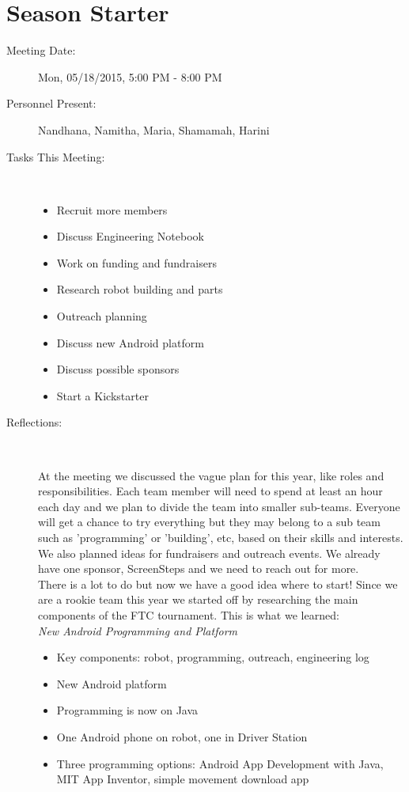 \documentclass[11pt,fleqn]{book} %
\begin{document}
\chapter{Season Starter}
\begin{description}
\item[Meeting Date:] Mon, 05/18/2015, 5:00 PM - 8:00 PM
\item[Personnel Present:] Nandhana, Namitha, Maria, Shamamah, Harini\\

\item[Tasks This Meeting:] \
\begin{itemize}
\item Recruit more members
\item Discuss Engineering Notebook
\item Work on funding and fundraisers
\item Research robot building and parts
\item Outreach planning
\item Discuss new Android platform
\item Discuss possible sponsors
\item Start a Kickstarter\\
\end{itemize}

\item[Reflections:] \

At the meeting we discussed the vague plan for this year, like roles and responsibilities. Each team member will need to spend at least an hour each day and we plan to divide the team into smaller sub-teams. Everyone will get a chance to try everything but they may belong to a sub team such as 'programming' or 'building', etc, based on their skills and interests. We also planned ideas for fundraisers and outreach events. We already have one sponsor, ScreenSteps and we need to reach out for more.\\
	
There is a lot to do but now we have a good idea where to start! Since we are a rookie team this year we started off by researching the main components of the FTC tournament. This is what we learned:\\

\textit {New Android Programming and Platform}
\begin{itemize}  
\item Key components: robot, programming, outreach, engineering log
\item New Android platform
\item Programming is now on Java
\item One Android phone on robot, one in Driver Station 
\item Three programming options: Android App Development with Java, MIT App Inventor, simple movement download app\\
\end{itemize}


\end{description}
\end{document}
